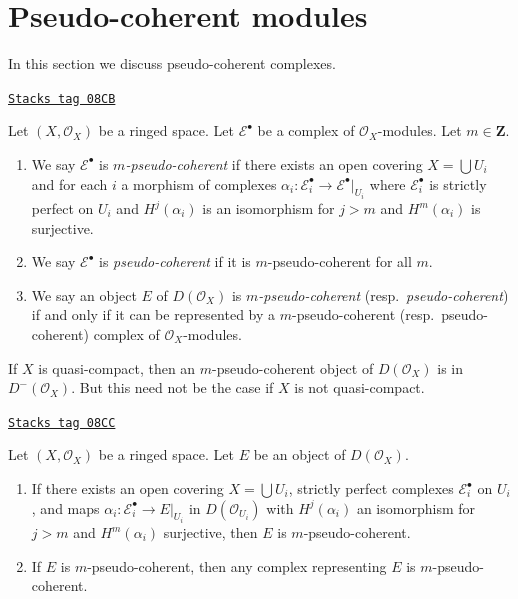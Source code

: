 \section{Pseudo-coherent modules}
\label{cohomology-section-pseudo-coherent}
In this section we discuss pseudo-coherent complexes.

\begin{definition}
\label{cohomology-definition-pseudo-coherent}
\href{https://stacks.math.columbia.edu/tag/08CB}{\texttt{Stacks tag 08CB}}

Let $(X, \mathcal{O}_X)$ be a ringed space. Let $\mathcal{E}^\bullet$
be a complex of $\mathcal{O}_X$-modules. Let $m \in \mathbf{Z}$.
\begin{enumerate}
\item We say $\mathcal{E}^\bullet$ is {\it $m$-pseudo-coherent}
if there exists an open covering $X = \bigcup U_i$ and for each $i$
a morphism of complexes
$\alpha_i : \mathcal{E}_i^\bullet \to \mathcal{E}^\bullet|_{U_i}$
where $\mathcal{E}_i^\bullet$ is strictly perfect on $U_i$ and
$H^j(\alpha_i)$ is an isomorphism for $j > m$ and $H^m(\alpha_i)$
is surjective.
\item We say $\mathcal{E}^\bullet$ is {\it pseudo-coherent}
if it is $m$-pseudo-coherent for all $m$.
\item We say an object $E$ of $D(\mathcal{O}_X)$ is
{\it $m$-pseudo-coherent} (resp.\ {\it pseudo-coherent})
if and only if it can be represented by a $m$-pseudo-coherent
(resp.\ pseudo-coherent) complex of $\mathcal{O}_X$-modules.
\end{enumerate}
\end{definition}

If $X$ is quasi-compact, then an $m$-pseudo-coherent object
of $D(\mathcal{O}_X)$ is in $D^-(\mathcal{O}_X)$. But this need
not be the case if $X$ is not quasi-compact.

\begin{lemma}
\label{cohomology-lemma-pseudo-coherent-independent-representative}
\href{https://stacks.math.columbia.edu/tag/08CC}{\texttt{Stacks tag 08CC}}

Let $(X, \mathcal{O}_X)$ be a ringed space. Let $E$ be an object
of $D(\mathcal{O}_X)$.
\begin{enumerate}
\item If there exists an open covering $X = \bigcup U_i$,
strictly perfect complexes $\mathcal{E}_i^\bullet$ on $U_i$, and
maps $\alpha_i : \mathcal{E}_i^\bullet \to E|_{U_i}$ in
$D(\mathcal{O}_{U_i})$ with $H^j(\alpha_i)$ an isomorphism for $j > m$
and $H^m(\alpha_i)$ surjective, then $E$ is $m$-pseudo-coherent.
\item If $E$ is $m$-pseudo-coherent, then any complex representing
$E$ is $m$-pseudo-coherent.
\end{enumerate}
\end{lemma}

